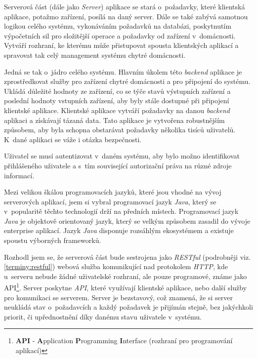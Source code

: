 Serverová část (dále jako \emph{Server}) aplikace se stará o~požadavky, které klientská aplikace, potažmo zařízení, posílá na daný server.
Dále se také zabývá samotnou logikou celého systému, vykonáváním požadavků na databázi, poskytnutím výpočetních sil pro složitější operace a požadavky od zařízení v~domácnosti.
Vytváří rozhraní, ke kterému může přistupovat spousta klientských aplikací a spravovat tak celý management systému chytré domácnosti.

Jedná se tak o~jádro celého systému.
Hlavním úkolem této \emph{backend} aplikace je zprostředkovat služby pro zařízení chytré domácnosti a pro připojení do systému.
Ukládá důležité hodnoty ze zařízení, co se týče stavů výstupních zařízení a poslední hodnoty vstupních zařízení, aby byly stále dostupné při připojení klientské aplikace.
Klientské aplikace vytváří požadavky na danou \emph{backend} aplikaci a získávají tázaná data.
Tato aplikace je vytvořena robustnějším způsobem, aby byla schopna obstarávat požadavky několika tisíců uživatelů.
K~dané aplikaci se váže i otázka bezpečnosti.

Uživatel se musí autentizovat v~daném systému, aby bylo možno identifikovat přihlášeného uživatele a s~tím související autorizační práva na různé zdroje informací.

Mezi velikou škálou programovacích jazyků, které jsou vhodné na vývoj serverových aplikací, jsem si vybral programovací jazyk \emph{Java},
který se v~popularitě těchto technologií drží na předních místech. Programovací jazyk \emph{Java} je objektově orientovaný jazyk, který se velkým způsobem zasadil do vývoje enterprise aplikací.
Jazyk \emph{Java} disponuje rozsáhlým ekosystémem a existuje spoustu výborných frameworků.

Rozhodl jsem se, že serverová část bude sestrojena jako \emph{RESTful} (podrobněji viz. \ref{terminy:restful}) webová služba komunikující nad protokolem \emph{HTTP},
kde u~serveru nebude žádné uživatelské rozhraní, ale pouze programové, známe jako API\footnote{\textbf{API} - \textbf{A}pplication \textbf{P}rogramming \textbf{I}nterface (rozhraní pro programování aplikací)}.
Server poskytne \emph{API}, které využívají klientské aplikace, nebo další služby pro komunikaci se serverem.
Server je bezstavový, což znamená, že si server neukládá stav o~požadavcích a každý požadavek je přijímán stejně, bez jakýchkoli priorit, či upřednostnění díky danému stavu uživatele v~systému.

